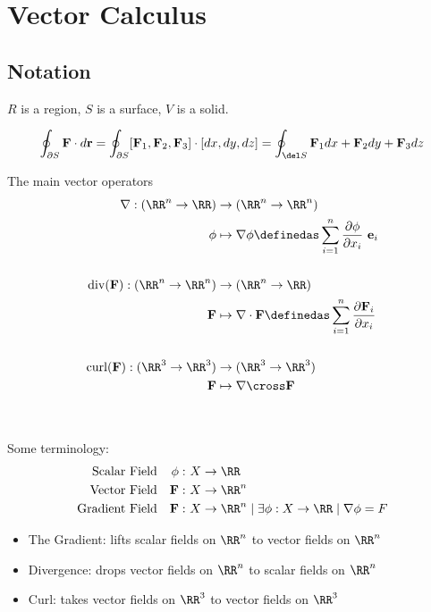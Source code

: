 \hypertarget{vector-calculus-1}{%
\section{Vector Calculus}\label{vector-calculus-1}}

\hypertarget{notation-1}{%
\subsection{Notation}\label{notation-1}}

\(R\) is a region, \(S\) is a surface, \(V\) is a solid.

\begin{align*}  
\oint _ { \partial S } \mathbf { F } \cdot d \mathbf { r } =    
\oint _ { \partial S } [\mathbf{F}_1, \mathbf{F}_2, \mathbf{F}_3] \cdot [dx, dy, dz] 
= \oint_{\del S} \mathbf{F}_1dx + \mathbf{F}_2dy + \mathbf{F}_3dz
\end{align*}

The main vector operators
\begin{align*}
\nabla: (\RR^n \to \RR) &\to (\RR^n \to \RR^n) \\
\phi &\mapsto \nabla \phi \definedas \sum_{i=1}^n \frac{\partial \phi}{\partial x_i} ~\mathbf{e}_i \\ \\
\text{}
\mathrm{div}(\mathbf{F}): (\RR^n \to \RR^n) &\to (\RR^n \to \RR) \\
\mathbf{F} &\mapsto \nabla \cdot \mathbf{F}
\definedas \sum_{i=1}^n \frac{\partial \mathbf{F}_i}{\partial x_i} \\ \\
\text{}
\mathrm{curl}(\mathbf{F}): (\RR^3 \to \RR^3) &\to (\RR^3 \to \RR^3) \\
\mathbf{F} &\mapsto \nabla \cross \mathbf{F} \\ \\
\text{}
\end{align*} Some terminology:
\begin{align*}
\text{Scalar Field} && \phi:&~ X \to \RR \\
\text{Vector Field} && \mathbf{F}:&~ X\to \RR^n\\
\text{Gradient Field} && \mathbf{F}:&~ X \to \RR^n \mid \exists \phi: X\to \RR \mid \nabla \phi = F
\end{align*}

\begin{itemize}
\tightlist
\item
  The Gradient: lifts scalar fields on \(\RR^n\) to vector fields on
  \(\RR^n\)
\item
  Divergence: drops vector fields on \(\RR^n\) to scalar fields on
  \(\RR^n\)
\item
  Curl: takes vector fields on \(\RR^3\) to vector fields on \(\RR^3\)
\end{itemize}

